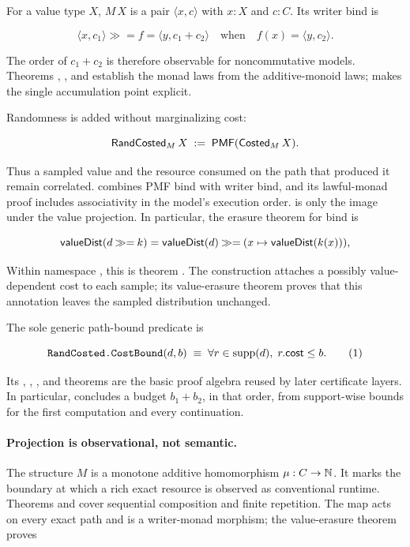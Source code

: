 For a value type \(X\), \(M\,X\) is a pair
\(\langle x,c\rangle\) with \(x:X\) and \(c:C\).  Its writer bind is

\[
  \langle x,c_1\rangle \mathbin{\gg=} f
  = \langle y,c_1+c_2\rangle
  \quad\text{when}\quad f(x)=\langle y,c_2\rangle .
\]

The order of \(c_1+c_2\) is therefore observable for noncommutative models.
Theorems , , and
 establish the monad laws from the additive-monoid
laws;  makes the single accumulation point explicit.

Randomness is added without marginalizing cost:

\[
  \mathsf{RandCosted}_M\,X \;:=\; \mathsf{PMF}(\mathsf{Costed}_M\,X).
\]

Thus a sampled value and the resource consumed on the path that produced it
remain correlated.   combines PMF bind with writer bind,
and its lawful-monad proof includes associativity in the model's execution
order.  \mbox{} is only the image under the value
projection.  In particular, the erasure theorem for bind is

\[
  \mathsf{valueDist}(d \mathbin{\gg=} k)
    = \mathsf{valueDist}(d) \mathbin{\gg=} (x \mapsto \mathsf{valueDist}(k(x))),
\]

Within namespace , this is theorem .
The construction  attaches a possibly value-dependent
cost to each sample; its value-erasure theorem proves that this annotation
leaves the sampled distribution unchanged.

The sole generic path-bound predicate is

\[
  \decl{RandCosted.CostBound}(d,b)
  \;\equiv\;
  \forall r\in\operatorname{supp}(d),\; r.\cost\leq b.
  \tag{1}
\]

Its , , , and  theorems are the
basic proof algebra reused by later certificate layers.  In particular,
 concludes a budget \(b_1+b_2\), in that
order, from support-wise bounds for the first computation and every
continuation.

\paragraph{Projection is observational, not semantic.}
The structure \(M\) is a monotone additive homomorphism
\(\mu:C\rightarrow\mathbb{N}\).  It marks the boundary at which a rich exact resource is
observed as conventional runtime.  Theorems  and
 cover sequential composition and finite
repetition.  The map  acts on every exact path and is
a writer-monad morphism; the value-erasure theorem
\mbox{} proves

